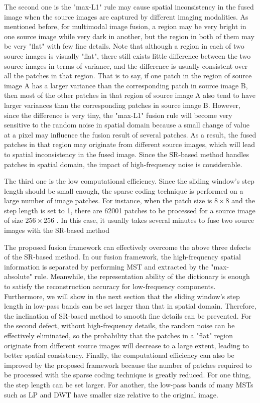The second one is the "max-L1" rule may cause spatial inconsistency in the fused image when the source images are captured by different imaging modalities. As mentioned before, for multimodal image fusion, a region may be very bright in one source image while very dark in another, but the region in both of them may be very "flat" with few fine details. Note that although a region in each of two source images is visually "flat", there still exists little difference between the two source images in terms of variance, and the difference is usually consistent over all the patches in that region. That is to say, if one patch in the region of source image A
has a larger variance than the corresponding patch in source image B, then most of the other patches in that region of source image A also tend to have larger variances than the corresponding patches in source image B. However, since the difference is very tiny, the "max-L1" fusion rule will become very sensitive to the random noise in spatial domain because a small change of value at a pixel may influence the fusion result of several patches. As a result, the fused patches in that region may originate from different source images, which will lead to spatial inconsistency in the fused image. Since the SR-based method handles patches in spatial domain, the
impact of high-frequency noise is considerable. \hfill \break

The third one is the low computational efficiency. Since the sliding window’s step length should be small enough, the sparse coding technique is performed on a large number of image patches. For instance, when the patch size is \(8\times8 \) and the step length is set to 1, there are 62001 patches to be processed for a source image of size \(256 \times256\) . In this case, it usually takes several minutes to fuse two source images with the SR-based method \hfill \break

The proposed fusion framework can effectively overcome the
above three defects of the SR-based method. In our fusion framework, the high-frequency spatial information is separated by performing MST and extracted by the "max-absolute" rule.
Meanwhile, the representation ability of the dictionary is enough to satisfy the reconstruction accuracy for low-frequency components. Furthermore, we will show in the next section that the sliding window’s step length in low-pass bands can be set larger than that in spatial domain. Therefore, the inclination of SR-based method to smooth fine details can be prevented. For the second defect, without high-frequency details, the random noise can be effectively eliminated, so the probability that the patches in a "flat" 
region originate from different source images will decrease to a large extent, leading to better spatial consistency. Finally, the computational efficiency can also be improved by the proposed framework because the number of patches required to be processed with the sparse coding technique is greatly reduced. For one thing, the step length can be set larger. For another, the low-pass bands of many MSTs such as LP and DWT have smaller size relative to the original image. \\ \\ 

